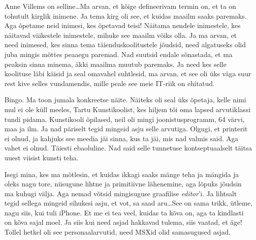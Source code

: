 Anne Villems on selline\ldots  Ma arvan, et kõige defineerivam termin on, et ta 
on tohutult kirglik inimene. Ja tema kirg oli see, et kuidas maailm saaks 
paremaks. Aga  õpetame neid inimesi, kes õpetavad teisi! Näitama nendele 
inimestele, kes näitavad väikestele inimestele, mihuke see maailm võiks olla. 
Ja ma arvan, et need inimesed, kes sinna tema täienduskoolitustele jõudsid, 
need algatuseks olid juba mingis mõttes peaaegu paremad. Nad suutsid endale  
sõnastada, et ma peaksin sinna minema, äkki maailma muutub paremaks. Ja need 
kes selle koolituse läbi käisid ja seal  omavahel suhtlesid, ma arvan, et see 
oli  üks väga suur rest kive selles vundamendis, mille peale see meie IT-riik on 
ehitatud.


Bingo. Ma toon jumala konkreetse näite. Näiteks oli  seal 
üks õpetaja, kelle nimi mul ei ole küll meeles,  Tartu 
Kunstikoolist, kes hiljem tõi oma lapsed 
arvutiklassi tundi pidama. Kunstikooli õpilased, neil oli mingi 
joonistusprogramm, 64 värvi, maa ja ilm. Ja nad päriselt tegid mingeid asju 
selle arvutiga. Olgugi, et printerit ei olnud, ja kahjuks see meedia jäi sinna, 
kus ta jäi,  mis nad valmis said. Aga vahet ei olnud. Täiesti ebaoluline.  
Nad said selle tunnetuse kontseptuaalselt täitsa uuest viisist kunsti teha. 

Isegi mina, kes ma mõtlesin, et kuidas ikkagi saaks mänge teha ja 
mängida ja  oleks nagu tore, niisugune lihtne ja primitiivne lähenemine, aga 
lõpuks jõudsin ma kuhugi välja. Aga nemad võtsid  
mingisuguse graafilise \emph{editor}'i. Ja lihtsalt tegid sellega mingeid 
sihukesi asju, et vot, sa saad aru\ldots See on sama trikk, ütleme, nagu siis, 
kui tuli iPhone. Et me ei tea veel, kuidas ta kõva on, aga ta kindlasti on kõva 
sajal moel. Ja siis kui need asjad hakkavad tulema, siis vaatad, et äge! Tollel 
hetkel oli see personaalarvutid, need MSXid olid samasugused asjad.


